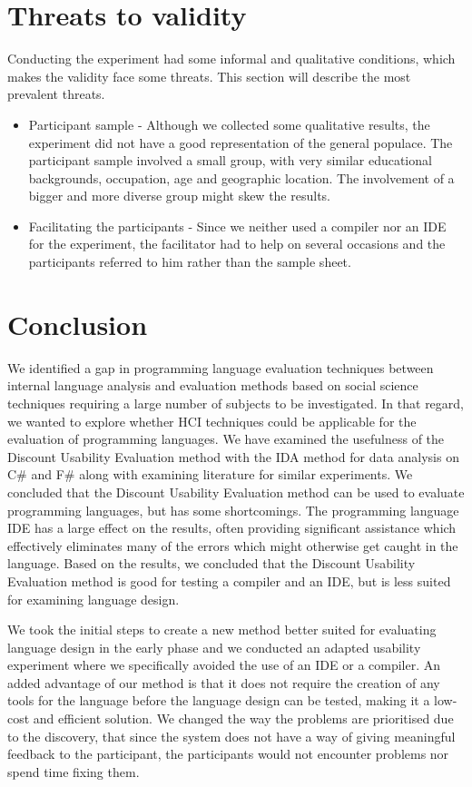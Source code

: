 \documentclass[preprint,10pt]{sigplanconf}
\begin{document}
\section{Threats to validity}
Conducting the experiment had some informal and qualitative conditions, which makes the validity face some threats. This section will describe the most prevalent threats.
\begin{itemize}
\item Participant sample - Although we collected some qualitative results, the experiment did not have a good representation of the general populace. The participant sample involved a small group, with very similar educational backgrounds, occupation, age and geographic location. The involvement of a bigger and more diverse group might skew the results.
\item Facilitating the participants - Since we neither used a compiler nor an IDE for the experiment, the facilitator had to help on several occasions and the participants referred to him rather than the sample sheet.
\end{itemize}

\section{Conclusion}
We identified a gap in programming language evaluation techniques between internal language analysis and evaluation methods based on social science techniques requiring a large number of subjects to be investigated. In that regard, we wanted to explore whether HCI techniques could be applicable for the evaluation of programming languages.
We have examined the usefulness of the Discount Usability Evaluation method with the IDA method for data analysis on C\# and F\# along with examining literature for similar experiments. We concluded that the Discount Usability Evaluation method can be used to evaluate programming languages, but has some shortcomings.
The programming language IDE has a large effect on the results, often providing significant assistance which effectively eliminates many of the errors which might otherwise get caught in the language.
Based on the results, we concluded that the Discount Usability Evaluation method is good for testing a compiler and an IDE, but is less suited for examining language design.

We took the initial steps to create a new method better suited for evaluating language design in the early phase and we conducted an adapted usability experiment where we specifically avoided the use of an IDE or a compiler.
An added advantage of our method is that it does not require the creation of any tools for the language before the language design can be tested, making it a low-cost and efficient solution.
We changed the way the problems are prioritised due to the discovery, that since the system does not have a way of giving meaningful feedback to the participant, the participants would not encounter problems nor spend time fixing them.
\end{document}
